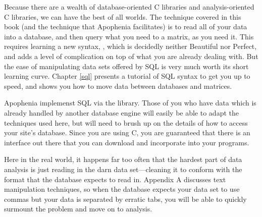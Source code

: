  Because there
are a wealth of database-oriented C libraries and analysis-oriented C
libraries, we can have the best of all worlds. The technique covered
in this book (and the technique that Apophenia facilitates) is to read
all of your data into a database, and then query what you need to a
matrix, as you need it. This requires learning a new syntax, ,
which is decidedly neither Beautiful nor Perfect, and adds a level of
complication on top of what you are already dealing with. But the ease
of manipulating data sets offered by SQL is very much worth its short
learning curve. Chapter \ref{sql} presents a tutorial of SQL syntax to
get you up to speed, and shows you how to move data between databases
and matrices.

Apophenia implemenst SQL via the  library.  Those of you
who have data which is already handled by another database engine will
easily be able to adapt the techniques used here, but will need to brush
up on the details of how to access your site's database. Since you are
using C, you are guaranteed that there is an interface out there that
you can download and incorporate into your programs.

Here in the real world, it happens far too often that the hardest
part of data analysis is just reading in the darn data set---cleaning
it to conform with the format that the database expects to read in.
Appendix A discusses text manipulation techniques,
so when the database expects your data set to use commas but your data
is separated by erratic tabs, you will be able to quickly surmount the
problem and move on to analysis.

